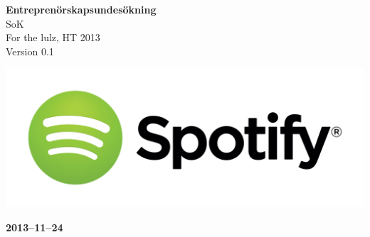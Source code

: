 \documentclass[pdftex, fontsize=11pt, a4paper]{scrbook}
\begin{document}
\begin{titlepage}
\thispagestyle{empty}
\begin{center}
	\vspace*{4\baselineskip}

	\textbf{\huge Entreprenörskapsundesökning} \\
	\vspace*{0.5\baselineskip}
	{\large  SoK} \\
	\vspace*{0.5\baselineskip}
	{\large  For the lulz, HT 2013} \\
	\vspace*{0.5\baselineskip}
	{\large  Version 0.1}


	\vspace*{6\baselineskip}
	\includegraphics[width=\linewidth]{SpotifyLogo}


	\normalfont
	\small
	\vfill


	\vspace*{2\baselineskip}

	\textbf{2013--11--24} \\
	[2\baselineskip]
\end{center}

\end{titlepage}
\end{document}
